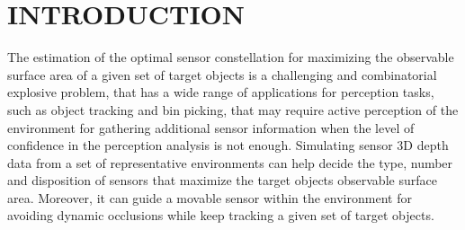 \section{\uppercase{Introduction}}\label{sec:introduction}


\noindent The estimation of the optimal sensor constellation for maximizing the observable surface area of a given set of target objects is a challenging and combinatorial explosive problem, that has a wide range of applications for perception tasks, such as object tracking and bin picking, that may require active perception of the environment for gathering additional sensor information when the level of confidence in the perception analysis is not enough. Simulating sensor 3D depth data from a set of representative environments can help decide the type, number and disposition of sensors that maximize the target objects observable surface area. Moreover, it can guide a movable sensor within the environment for avoiding dynamic occlusions while keep tracking a given set of target objects.
